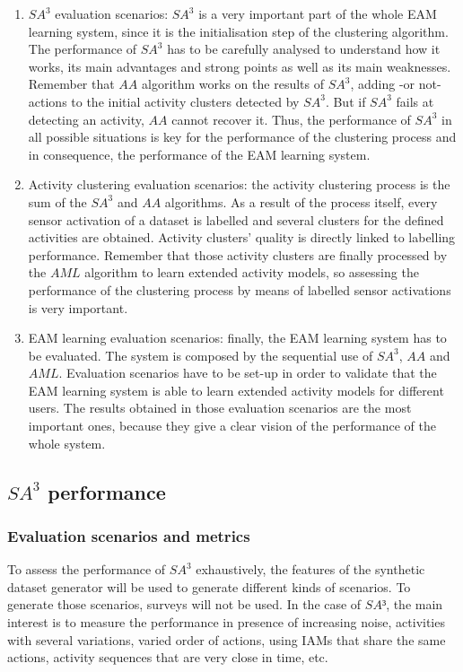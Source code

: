 \begin{enumerate}
 \item $SA^3$ evaluation scenarios: $SA^3$ is a very important part of the whole EAM learning system, since it is the initialisation step of the clustering algorithm. The performance of $SA^3$ has to be carefully analysed to understand how it works, its main advantages and strong points as well as its main weaknesses. Remember that $AA$ algorithm works on the results of $SA^3$, adding -or not- actions to the initial activity clusters detected by $SA^3$. But if $SA^3$ fails at detecting an activity, $AA$ cannot recover it. Thus, the performance of $SA^3$ in all possible situations is key for the performance of the clustering process and in consequence, the performance of the EAM learning system.
 \item Activity clustering evaluation scenarios: the activity clustering process is the sum of the $SA^3$ and $AA$ algorithms. As a result of the process itself, every sensor activation of a dataset is labelled and several clusters for the defined activities are obtained. Activity clusters' quality is directly linked to labelling performance. Remember that those activity clusters are finally processed by the $AML$ algorithm to learn extended activity models, so assessing the performance of the clustering process by means of labelled sensor activations is very important.
 \item EAM learning evaluation scenarios: finally, the EAM learning system has to be evaluated. The system is composed by the sequential use of $SA^3$, $AA$ and $AML$. Evaluation scenarios have to be set-up in order to validate that the EAM learning system is able to learn extended activity models for different users. The results obtained in those evaluation scenarios are the most important ones, because they give a clear vision of the performance of the whole system.
\end{enumerate}

\subsection{$SA^3$ performance}
\label{subsec:evaluation:sa3}

\subsubsection{Evaluation scenarios and metrics}
\label{subsubsec:evaluation:sa3:scenarios}
To assess the performance of $SA^3$ exhaustively, the features of the synthetic dataset generator will be used to generate different kinds of scenarios. To generate those scenarios, surveys will not be used. In the case of $SA³$, the main interest is to measure the performance in presence of increasing noise, activities with several variations, varied order of actions, using IAMs that share the same actions, activity sequences that are very close in time, etc.

